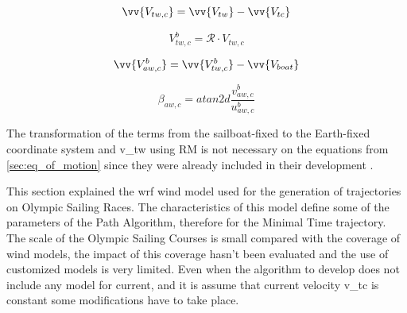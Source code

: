 \begin{equation}\label{eq:V_twModifV_C}
    \vv{V_{tw,c}}=\vv{V_{tw}}- \vv{V_{tc}}
\end{equation}

\begin{equation}\label{eq:v_twCurBoat}
    V_{tw,c}^b=\mathcal{R} \cdot V_{tw,c}
\end{equation}

\begin{equation} \label{eq:VelCurrWind_boat}
    \vv{V_{aw,c}^b}= \vv{V_{tw,c}^b} - \vv{V_{boat}}
\end{equation}

\begin{equation}\label{eq:b_tw_c}
    \beta_{aw,c}= atan2d \frac {v_{aw,c}^b}{u_{aw,c}^b}
\end{equation}

The transformation of the terms from the sailboat-fixed to the Earth-fixed coordinate system and \acrshort{v_tw} using \acrshort{RM} is not necessary on the equations from \ref{sec:eq_of_motion} since they were already included in their development \cite{keuning2004mathematical}.\par  




This section explained the \acrshort{wrf} wind model used for the generation of trajectories on Olympic Sailing Races. The characteristics of this model define some of the parameters of the Path Algorithm, therefore for the Minimal Time trajectory. The scale of the Olympic Sailing Courses is small compared with the coverage of wind models, the impact of this coverage hasn't been evaluated and the use of customized models is very limited. Even when the algorithm to develop does not include any model for current, and it is assume that current velocity \acrshort{v_tc} is constant some modifications have to take place. 